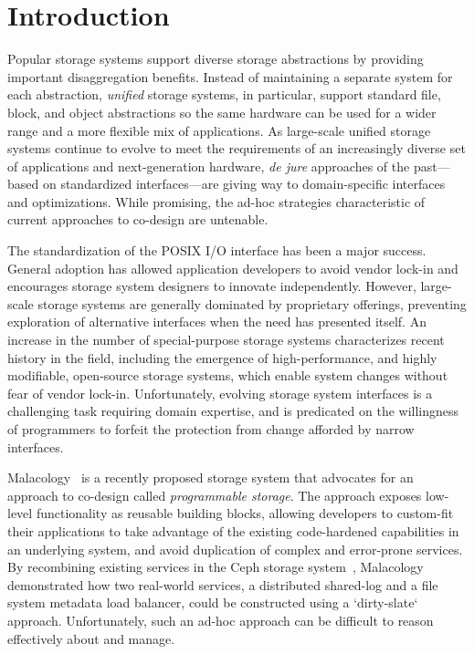 \section{Introduction}
\label{sec:intro}

Popular storage systems support diverse storage abstractions by
providing important disaggregation benefits. Instead of maintaining
a separate system for each abstraction, \emph{unified} storage
systems, in particular, support standard file, block, and object abstractions so the same
hardware can be used for a wider range and a more flexible mix of applications. 
As large-scale unified storage systems continue to evolve to meet the requirements 
of an increasingly diverse set of applications and next-generation hardware, \emph{de jure}
approaches of the past---based on standardized interfaces---are giving way to
domain-specific interfaces and optimizations. While promising, the ad-hoc strategies characteristic of 
current approaches to co-design are untenable.

The standardization of the POSIX I/O interface has been a major success. General adoption
has allowed application developers to avoid vendor lock-in and encourages storage system
designers to innovate independently. However, large-scale storage systems are generally dominated 
by proprietary offerings, preventing exploration of alternative
interfaces when the need has presented itself. An increase in the number of special-purpose storage systems characterizes recent history
in the field, including the emergence of high-performance, and highly modifiable, open-source storage systems, 
which enable system changes without fear of vendor lock-in. Unfortunately, evolving storage system
interfaces is a challenging task requiring domain expertise, and is predicated on the willingness of
programmers to forfeit the protection from change afforded by narrow
interfaces.

Malacology~\cite{sevilla:eurosys17} is a recently proposed storage system that
advocates for an approach to co-design called \emph{programmable storage}. The
approach exposes low-level functionality as reusable building
blocks, allowing developers to custom-fit their applications to take advantage
of the existing code-hardened capabilities in an underlying system, and avoid
duplication of complex and error-prone services. By recombining existing
services in the Ceph storage system~\cite{weil:osdi2006-ceph}, Malacology
demonstrated how two
real-world services, a distributed shared-log and a file system metadata load
balancer, could be constructed using a `dirty-slate` approach. Unfortunately,
such an ad-hoc approach can be difficult to reason effectively about and manage.


